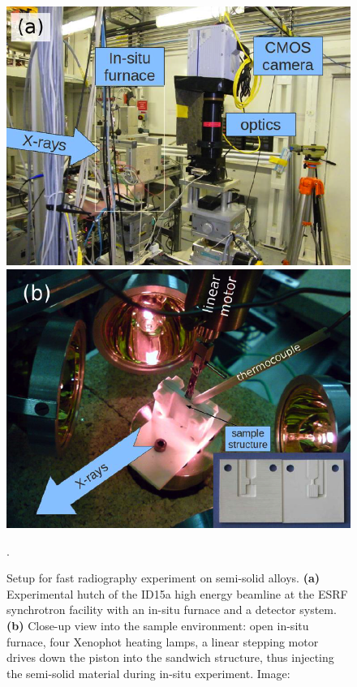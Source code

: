 \begin{figure}[ht]
  \centerline{
    \mbox{\includegraphics[scale = 0.314]{figures/app_thixo_setup1.PNG}}
    \mbox{\includegraphics[scale = 0.314]{figures/app_thixo_setup2.PNG}}  
  }  
  \caption{Setup for fast radiography experiment on semi-solid alloys. \textbf{(a)}  Experimental hutch of the ID15a high energy beamline at the ESRF synchrotron facility with an in-situ furnace and a detector system. \textbf{(b)}
Close-up view into the sample environment: open in-situ furnace, four Xenophot heating lamps, a linear stepping motor drives down the piston into the
sandwich structure, thus injecting the semi-solid material during in-situ experiment. Image: \cite{Zabler13}}.
  \label{fig:app_thixo_setup}
\end{figure}

